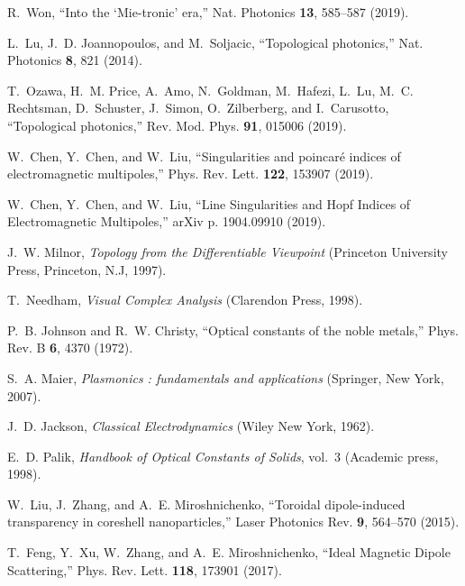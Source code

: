 \documentclass[aps,twocolumn,superscriptaddress]{revtex4-1}
\begin{document}
\begin{thebibliography}{10}
R.~Won, \enquote{Into the `{{Mie}}-tronic' era,} Nat. Photonics \textbf{13},
  585--587 (2019).

L.~Lu, J.~D. Joannopoulos, and M.~Soljacic, \enquote{Topological photonics,}
  Nat. Photonics \textbf{8}, 821 (2014).

T.~Ozawa, H.~M. Price, A.~Amo, N.~Goldman, M.~Hafezi, L.~Lu, M.~C. Rechtsman,
  D.~Schuster, J.~Simon, O.~Zilberberg, and I.~Carusotto, \enquote{Topological
  photonics,} Rev. Mod. Phys. \textbf{91}, 015006 (2019).

W.~Chen, Y.~Chen, and W.~Liu, \enquote{Singularities and poincar\'e indices of
  electromagnetic multipoles,} Phys. Rev. Lett. \textbf{122}, 153907 (2019).

W.~Chen, Y.~Chen, and W.~Liu, \enquote{Line {{Singularities}} and {{Hopf
  Indices}} of {{Electromagnetic Multipoles}},} arXiv p. 1904.09910 (2019).

J.~W. Milnor, \emph{Topology from the {{Differentiable Viewpoint}}} ({Princeton
  University Press}, Princeton, N.J, 1997).

T.~Needham, \emph{Visual {{Complex Analysis}}} ({Clarendon Press}, 1998).

P.~B. Johnson and R.~W. Christy, \enquote{Optical constants of the noble
  metals,} Phys. Rev. B \textbf{6}, 4370 (1972).

S.~A. Maier, \emph{Plasmonics : fundamentals and applications} (Springer, New
  York, 2007).

J.~D. Jackson, \emph{Classical Electrodynamics} (Wiley New York, 1962).

E.~D. Palik, \emph{Handbook of Optical Constants of Solids}, vol.~3 ({Academic
  press}, 1998).

W.~Liu, J.~Zhang, and A.~E. Miroshnichenko, \enquote{Toroidal dipole-induced
  transparency in core\textendash{}shell nanoparticles,} Laser Photonics Rev.
  \textbf{9}, 564--570 (2015).

T.~Feng, Y.~Xu, W.~Zhang, and A.~E. Miroshnichenko, \enquote{Ideal {{Magnetic
  Dipole Scattering}},} Phys. Rev. Lett. \textbf{118}, 173901 (2017).


\end{thebibliography}
\end{document}
